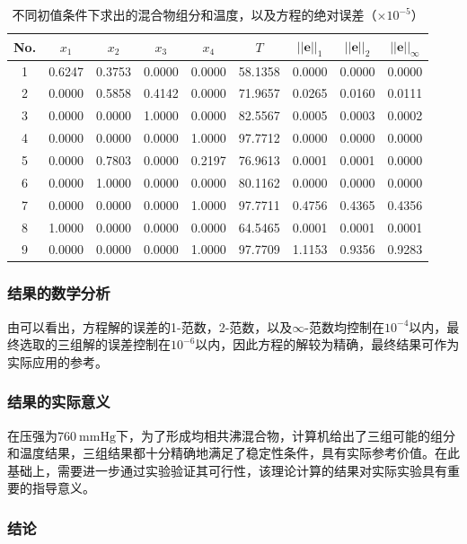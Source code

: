 \documentclass[12pt,a4paper]{article}
\begin{document}
\begin{table}
    \centering
    \caption{不同初值条件下求出的混合物组分和温度，以及方程的绝对误差（$\times 10^{-5}$）}
    \label{tab:ex6_all_solutions}
    \begin{tabular}{c|ccccc|ccc}
        \toprule
        No. & \(x_1\) & \(x_2\) & \(x_3\) & \(x_4\) & \(T\) &
        \(||\boldsymbol{e}||_1\) & \(||\boldsymbol{e}||_2\) &
        \(||\boldsymbol{e}||_\infty\)\tabularnewline
        \midrule
        1 & 0.6247 & 0.3753 & 0.0000 & 0.0000 & 58.1358 & 0.0000 & 0.0000 &
        0.0000\tabularnewline
        2 & 0.0000 & 0.5858 & 0.4142 & 0.0000 & 71.9657 & 0.0265 & 0.0160 &
        0.0111\tabularnewline
        3 & 0.0000 & 0.0000 & 1.0000 & 0.0000 & 82.5567 & 0.0005 & 0.0003 &
        0.0002\tabularnewline
        4 & 0.0000 & 0.0000 & 0.0000 & 1.0000 & 97.7712 & 0.0000 & 0.0000 &
        0.0000\tabularnewline
        5 & 0.0000 & 0.7803 & 0.0000 & 0.2197 & 76.9613 & 0.0001 & 0.0001 &
        0.0000\tabularnewline
        6 & 0.0000 & 1.0000 & 0.0000 & 0.0000 & 80.1162 & 0.0000 & 0.0000 &
        0.0000\tabularnewline
        7 & 0.0000 & 0.0000 & 0.0000 & 1.0000 & 97.7711 & 0.4756 & 0.4365 &
        0.4356\tabularnewline
        8 & 1.0000 & 0.0000 & 0.0000 & 0.0000 & 64.5465 & 0.0001 & 0.0001 &
        0.0001\tabularnewline
        9 & 0.0000 & 0.0000 & 0.0000 & 1.0000 & 97.7709 & 1.1153 & 0.9356 &
        0.9283\tabularnewline
        \bottomrule
    \end{tabular}
\end{table}

\subsubsection{结果的数学分析}

由可以看出，方程解的误差的1-范数，2-范数，以及$\infty$-范数均控制在$10^{-4}$以内，最终选取的三组解的误差控制在$10^{-6}$以内，因此方程的解较为精确，最终结果可作为实际应用的参考。

\subsubsection{结果的实际意义}

在压强为$760\ \mathrm{mmHg}$下，为了形成均相共沸混合物，计算机给出了三组可能的组分和温度结果，三组结果都十分精确地满足了稳定性条件，具有实际参考价值。在此基础上，需要进一步通过实验验证其可行性，该理论计算的结果对实际实验具有重要的指导意义。

\subsubsection{结论}
\end{document}
